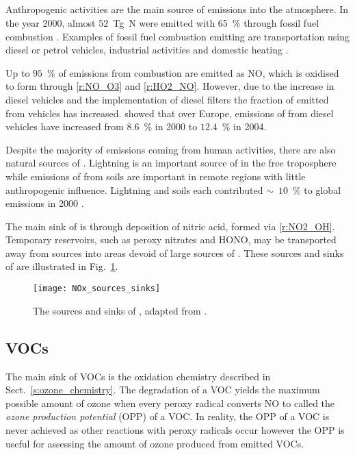\subsection[NOx]{}
Anthropogenic activities are the main source of  emissions into the atmosphere.
In the year 2000, almost $52$~Tg~N were emitted with 65~\% through fossil fuel combustion \citep{Seinfeld:2006}. 
Examples of fossil fuel combustion emitting  are transportation using diesel or petrol vehicles, industrial activities and domestic heating \citep{vonSchneidemesser:2015}.

Up to $95$~\% of  emissions from combustion are emitted as NO, which is oxidised to form  through \eqref{r:NO_O3} and \eqref{r:HO2_NO}.
However, due to the increase in diesel vehicles and the implementation of diesel filters the fraction of emitted  from vehicles has increased.
\citet{Grice:2009} showed that over Europe, emissions of  from diesel vehicles have increased from $8.6$~\% in 2000 to $12.4$~\% in 2004.

Despite the majority of  emissions coming from human activities, there are also natural sources of .
Lightning is an important source of  in the free troposphere while emissions of  from soils are important in remote regions with little anthropogenic influence.
Lightning and soils each contributed $\sim$~$10$~\% to global  emissions in 2000 \citep{Seinfeld:2006}.

The main sink of  is through deposition of nitric acid, formed via \eqref{r:NO2_OH}.
Temporary reservoirs, such as peroxy nitrates and HONO, may be transported away from sources into areas devoid of large sources of .
These sources and sinks of  are illustrated in Fig.~\ref{f:NOx_sources_sinks}.
\begin{figure}[t]%
	\begin{center}%
        \caption[ sources and sinks]{The sources and sinks of , adapted from \citet{Seinfeld:2006}.}%
        \texttt{[image: NOx\_sources\_sinks]}%
        \label{f:NOx_sources_sinks}%
	\end{center}%
\end{figure}%

\subsection{VOCs}
The main sink of VOCs is the oxidation chemistry described in Sect.~\ref{s:ozone_chemistry}.
The degradation of a VOC yields the maximum possible amount of ozone when every peroxy radical converts NO to  called the \emph{ozone production potential} (OPP) of a VOC.
In reality, the OPP of a VOC is never achieved as other reactions with peroxy radicals occur however the OPP is useful for assessing the amount of ozone produced from emitted VOCs.

